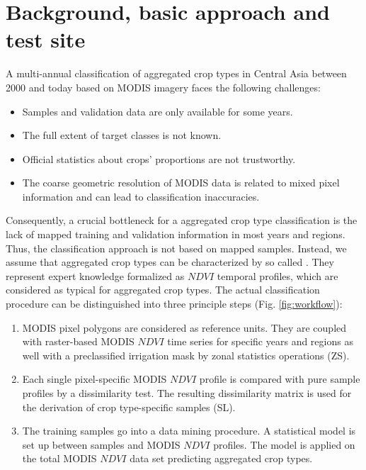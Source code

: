 \section{Background, basic approach and test site}
A multi-annual classification of aggregated crop types in Central Asia between 2000 and today based on MODIS imagery faces the following challenges:

\begin{itemize}
\item Samples and validation data are only available for some years.
\item The full extent of target classes is not known.
\item Official statistics about crops' proportions are not trustworthy.
\item The coarse geometric resolution of MODIS data is related to mixed pixel information and can lead to classification inaccuracies.
\end{itemize}

Consequently, a crucial bottleneck for a aggregated crop type classification is the lack of mapped training and validation information in most years and regions. Thus, the classification approach is not based on mapped samples. Instead, we assume 
that aggregated crop types can be characterized by so called . They represent expert knowledge formalized as $NDVI$ temporal profiles, which are considered as typical for aggregated crop types. The actual classification procedure can be distinguished into three principle steps (Fig. \ref{fig:workflow}):

\begin{enumerate}
\item MODIS pixel polygons are considered as reference units. They are coupled with raster-based MODIS $NDVI$ time series for specific years and regions as well with a preclassified irrigation mask by zonal statistics operations (ZS). 
\item Each single pixel-specific MODIS $NDVI$ profile is compared with pure sample profiles by a dissimilarity test. The resulting dissimilarity matrix is used for the derivation of crop type-specific samples (SL).
\item The training samples go into a data mining procedure. A statistical model is set up between samples and MODIS $NDVI$ profiles. The model is applied on the total MODIS $NDVI$ data set predicting aggregated crop types.
\end{enumerate}

